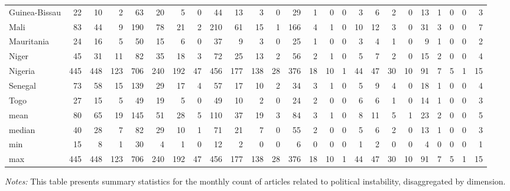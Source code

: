 \begin{landscape}
\begin{table}[!t]
{\begin{tabular}{lrrrrrrrrrrrrrrrrrrrrrrrr}
  Guinea-Bissau & 22 & 10 & 2 & 63 & 20 & 5 & 0 & 44 & 13 & 3 & 0 & 29 & 1 & 0 & 0 & 3 & 6 & 2 & 0 & 13 & 1 & 0 & 0 & 3 \\ 
  Mali & 83 & 44 & 9 & 190 & 78 & 21 & 2 & 210 & 61 & 15 & 1 & 166 & 4 & 1 & 0 & 10 & 12 & 3 & 0 & 31 & 3 & 0 & 0 & 7 \\ 
  Mauritania & 24 & 16 & 5 & 50 & 15 & 6 & 0 & 37 & 9 & 3 & 0 & 25 & 1 & 0 & 0 & 3 & 4 & 1 & 0 & 9 & 1 & 0 & 0 & 2 \\ 
  Niger & 45 & 31 & 11 & 82 & 35 & 18 & 3 & 72 & 25 & 13 & 2 & 56 & 2 & 1 & 0 & 5 & 7 & 2 & 0 & 15 & 2 & 0 & 0 & 4 \\ 
  Nigeria & 445 & 448 & 123 & 706 & 240 & 192 & 47 & 456 & 177 & 138 & 28 & 376 & 18 & 10 & 1 & 44 & 47 & 30 & 10 & 91 & 7 & 5 & 1 & 15 \\ 
  Senegal & 73 & 58 & 15 & 139 & 29 & 17 & 4 & 57 & 17 & 10 & 2 & 34 & 3 & 1 & 0 & 5 & 9 & 4 & 0 & 18 & 1 & 0 & 0 & 4 \\ 
  Togo & 27 & 15 & 5 & 49 & 19 & 5 & 0 & 49 & 10 & 2 & 0 & 24 & 2 & 0 & 0 & 6 & 6 & 1 & 0 & 14 & 1 & 0 & 0 & 3 \\ 
  mean & 80 & 65 & 19 & 145 & 51 & 28 & 5 & 110 & 37 & 19 & 3 & 84 & 3 & 1 & 0 & 8 & 11 & 5 & 1 & 23 & 2 & 0 & 0 & 5 \\ 
   \hline
 \hline
median & 40 & 28 & 7 & 82 & 29 & 10 & 1 & 71 & 21 & 7 & 0 & 55 & 2 & 0 & 0 & 5 & 6 & 2 & 0 & 13 & 1 & 0 & 0 & 3 \\ 
  min & 15 & 8 & 1 & 30 & 4 & 1 & 0 & 12 & 2 & 0 & 0 & 6 & 0 & 0 & 0 & 1 & 2 & 0 & 0 & 4 & 0 & 0 & 0 & 1 \\ 
  max & 445 & 448 & 123 & 706 & 240 & 192 & 47 & 456 & 177 & 138 & 28 & 376 & 18 & 10 & 1 & 44 & 47 & 30 & 10 & 91 & 7 & 5 & 1 & 15 \\ 
   \hline
 \hline
\end{tabular}
  }%
     \vspace{0.5em}
 \begin{minipage}{0.7\linewidth}
 {\footnotesize \textit{Notes:} This table presents summary statistics for the monthly count of articles related to political instability, disaggregated by dimension.}
 \end{minipage}
 \end{table}
\end{landscape}





